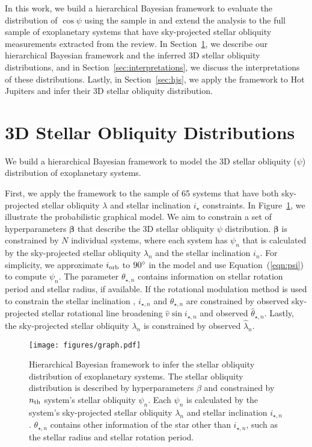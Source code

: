 \documentclass[twocolumn,times]{aastex631}
\newcommand{\numistar}{65\xspace}
\begin{document}
In this work, we build a hierarchical Bayesian framework to evaluate the distribution of $\cos{\psi}$ using the sample in \cite{Albrecht21} and extend the analysis to the full sample of exoplanetary systems that have sky-projected stellar obliquity measurements extracted from the \cite{Albrecht22} review.
In Section~\ref{sec:hbm}, we describe our hierarchical Bayesian framework and the inferred 3D stellar obliquity distributions, and in Section~\ref{sec:interpretations}, we discuss the interpretations of these distributions. Lastly, in Section~\ref{sec:hjs}, we apply the framework to Hot Jupiters and infer their 3D stellar obliquity distribution.

\section{3D Stellar Obliquity Distributions} \label{sec:hbm}
We build a hierarchical Bayesian framework to model the 3D stellar obliquity ($\psi$) distribution of exoplanetary systems.

First, we apply the framework to the sample of \numistar systems that have both sky-projected stellar obliquity $\lambda$ and stellar inclination $i_\star$ constraints.
In Figure~\ref{fig:graph}, we illustrate the probabilistic graphical model. We aim to constrain a set of hyperparameters $\bm{\beta}$ that describe the 3D stellar obliquity $\psi$ distribution. $\bm{\beta}$ is constrained by $N$ individual systems, where each system has $\psi_n$ that is calculated by the sky-projected stellar obliquity $\lambda_n$ and the stellar inclination $i_n$. For simplicity, we approximate $i_{\rm orb}$ to $90\mbox{$^\circ$}$ in the model and use Equation~(\ref{eqn:psi}) to compute $\psi_n$. 
The parameter $\theta_{\star, n}$ contains information on stellar rotation period and stellar radius, if available.
If the rotational modulation method is used to constrain the stellar inclination \citep[e.g.,][]{Masuda20}, $i_{\star,n}$ and $\theta_{\star,n}$ are constrained by observed sky-projected stellar rotational line broadening $\hat{v}\sin{i_{\star,n}}$ and observed $\hat{\theta}_{\star,n}$. Lastly, the sky-projected stellar obliquity $\lambda_n$ is constrained by observed $\hat{\lambda}_n$.

\begin{figure}
    \texttt{[image: figures/graph.pdf]}
    \caption{Hierarchical Bayesian framework to infer the stellar obliquity distribution of exoplanetary systems. The stellar obliquity distribution is described by hyperparameters $\beta$ and constrained by $n_{\rm th}$ system's stellar obliquity $\psi_n$. Each $\psi_n$ is calculated by the system's sky-projected stellar obliquity $\lambda_n$ and stellar inclination $i_{\star, n}$. $\theta_{\star, n}$ contains other information of the star other than $i_{\star, n}$, such as the stellar radius and stellar rotation period.}
    \label{fig:graph}
\end{figure}
\end{document}
